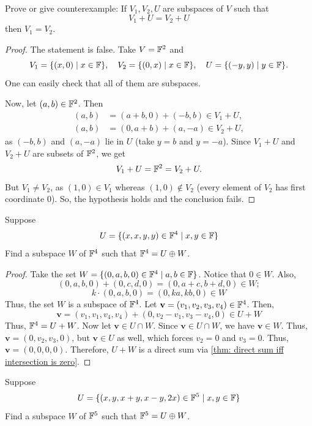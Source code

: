 \begin{exercise}
    \label{ex:1.18}
    Prove or give counterexample: If $V_1,V_2,U$ are subspaces of $V$ such that
    \[ V_1 + U = V_2 + U \]
    then $V_1=V_2$.
\end{exercise}
\begin{proof}
    The statement is false. Take $V=\mathbb{F}^2$ and
    \[ V_1=\{(x,0) \mid x \in \mathbb{F}\}, \quad V_2=\{(0,x) \mid x \in \mathbb{F}\}, \quad U=\{(-y,y) \mid y \in \mathbb{F}\}. \]
    One can easily check that all of them are subspaces.

    Now, let $(a,b) \in \mathbb{F}^2$. Then
    \begin{align*}
        (a,b) &= (a+b,0) + (-b,b) \in V_1+U, \\
        (a,b) &= (0,a+b) + (a,-a) \in V_2+U,
    \end{align*}
    as $(-b,b)$ and $(a,-a)$ lie in $U$ (take $y=b$ and $y=-a$). Since $V_1+U$ and $V_2+U$ are subsets of $\mathbb{F}^2$, we get
    \[ V_1+U=\mathbb{F}^2=V_2+U. \]
    But $V_1 \neq V_2$, as $(1,0) \in V_1$ whereas $(1,0) \notin V_2$ (every element of $V_2$ has first coordinate $0$). So, the hypothesis holds and the conclusion fails.
\end{proof}

\begin{exercise}
    Suppose 
    \[ U = \{(x,x,y,y) \in \mathbb{F}^4 \mid x,y \in \mathbb{F}\} \]
    Find a subspace $W$ of $\mathbb{F}^4$ such that $\mathbb{F}^4 = U \oplus W$. 
\end{exercise}

\begin{proof}
    Take the set $W=\{(0,a,b,0) \in \mathbb{F}^4 \mid a,b \in \mathbb{F}\}$. Notice that $0 \in W$. Also, 
    \[ (0,a,b,0)+(0,c,d,0)=(0,a+c,b+d,0) \in W; \]
    \[ k \cdot (0,a,b,0) = (0,ka,kb,0) \in W \]
    Thus, the set $W$ is a subspace of $\mathbb{F}^4$. 
    Let $\mathbf{v}=(v_1,v_2,v_3,v_4) \in \mathbb{F}^4$. Then,
    \[ \mathbf{v}=(v_1,v_1,v_4,v_4)+(0,v_2-v_1,v_3-v_4,0) \in U+W \]
    Thus, $\mathbb{F}^4= U+W$. 
    Now let $\mathbf{v} \in U \cap W$. Since $\mathbf{v} \in U \cap W$, we have $\mathbf{v} \in W$.
    Thus, \mbox{$\mathbf{v}=(0,v_2,v_3,0)$}, but $\mathbf{v} \in U$ as well, which forces $v_2=0$ and $v_3=0$. Thus, $\mathbf{v}=(0,0,0,0)$. Therefore, $U+W$ is a direct sum via \cref{thm: direct sum iff intersection is zero}.
\end{proof}

\begin{exercise}
    \label{ex:1.20}
    Suppose
    \[ U = \{(x,y,x+y,x-y,2x) \in \mathbb{F}^5 \mid x,y \in \mathbb{F}\} \]
    Find a subspace $W$ of $\mathbb{F}^5$ such that $\mathbb{F}^5 = U \oplus W$.
\end{exercise}

